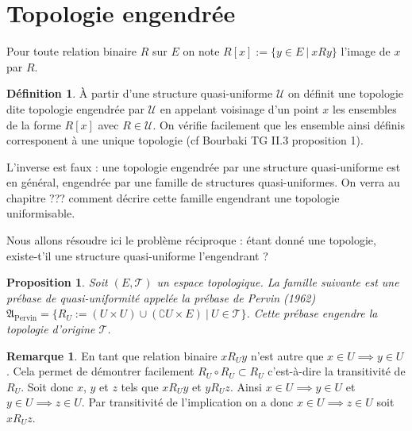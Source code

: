 \documentclass[a4paper, 11pt, french]{book}
\let\colour=\color
\theoremstyle{plain} %
\newtheorem{proposition}{Proposition}
\theoremstyle{definition} %
\newtheorem{definition}{Définition}
\newtheorem{remarque}{Remarque}
\theoremstyle{remark} %
\newcommand{\1}{\mathds{1}}
\renewcommand{\frak}[1]{\mathfrak{#1}}
\newcommand{\scr}[1]{\mathscr{#1}}
\newcommand{\rm}[1]{\mathrm{#1}}
\newcommand\ens[2]{\{#1 \ |\ #2\}}
\begin{document}
\section{Topologie engendrée}

Pour toute relation binaire $R$ sur $E$ on note $R[x]:=\ens{y\in E}{xRy}$ l'image de $x$ par $R$.

\begin{definition}
	À partir d'une structure quasi-uniforme $\mathscr{U}$ on définit une topologie dite topologie engendrée par $\mathscr{U}$ en appelant voisinage d'un point $x$ les ensembles de la forme $R[x]$ avec $R\in\mathscr{U}$.
	On vérifie facilement que les ensemble ainsi définis corresponent à une unique topologie (cf Bourbaki TG II.3 proposition 1).
\end{definition}

L'inverse est faux : une topologie engendrée par une structure quasi-uniforme est en général, engendrée par une famille de structures quasi-uniformes.
On verra au chapitre {\colour{red} ???} comment décrire cette famille engendrant une topologie uniformisable.

Nous allons résoudre ici le problème réciproque : étant donné une topologie, existe-t'il une structure quasi-uniforme l'engendrant ?

\begin{proposition}
	Soit $(E, \scr{T})$ un espace topologique.
	La famille suivante est une prébase de quasi-uniformité appelée la prébase de Pervin (1962) $\frak{A}_\rm{Pervin}=\ens{R_U:=(U\times U)\cup(\complement U\times E)}{U\in\scr{T}}$.
	Cette prébase engendre la topologie d'origine $\scr{T}$.
\end{proposition}

\begin{remarque}
	En tant que relation binaire $xR_Uy$ n'est autre que $x\in U\implies y\in U$.
	Cela permet de démontrer facilement $R_U\circ R_U\subset R_U$ c'est-à-dire la transitivité de $R_U$.
	Soit donc $x$, $y$ et $z$ tels que $xR_Uy$ et $yR_Uz$.
	Ainsi $x\in U\implies y\in U$ et $y\in U\implies z\in U$.
	Par transitivité de l'implication on a donc $x\in U\implies z\in U$ soit $xR_Uz$.
\end{remarque}
\end{document}
